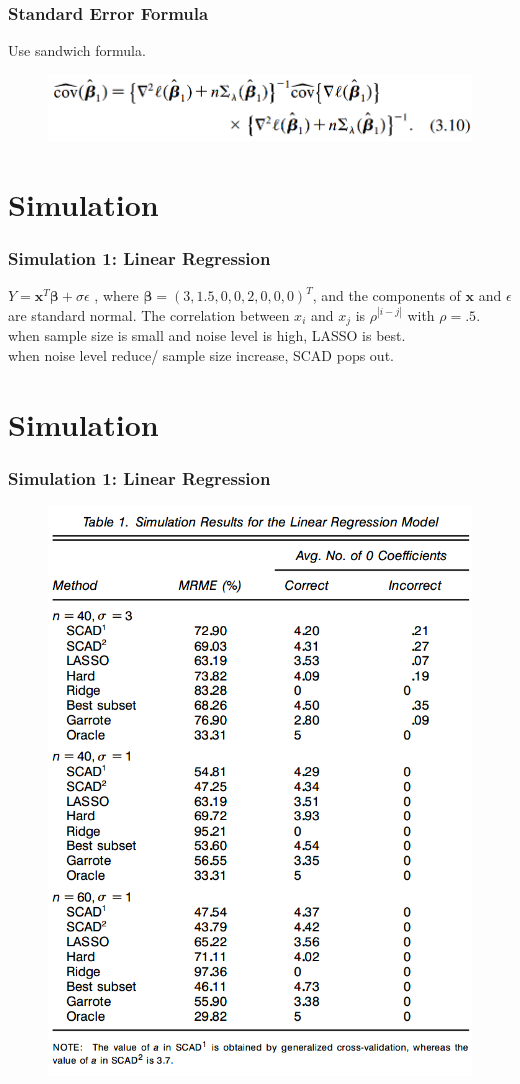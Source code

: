 \documentclass{beamer}
\begin{document}
	
	\begin{frame}
		\frametitle{Standard Error Formula}
		Use sandwich formula.
		\begin{figure}
			\includegraphics[width=0.7\linewidth]{image018.png}
		\end{figure}
	\end{frame}
	
	\section{Simulation}
	\begin{frame}
		\frametitle{Simulation 1: Linear Regression}
		$Y = \bm{x}^T\bm{\beta} + \sigma\epsilon$
		, where $\bm{\beta} = (3, 1.5, 0, 0, 2 ,0 ,0 ,0)^T$, and the components of $\bm{x}$ and $\epsilon$ are standard normal. The correlation between $x_i$ and $x_j$ is $\rho^{|i-j|}$ with $\rho = .5$.\\
		\vspace{\baselineskip}
		when sample size is small and noise level is high, LASSO is best.\\
		\vspace{\baselineskip}
		when noise level reduce/ sample size increase, SCAD pops out.
	\end{frame}
	
	\section{Simulation}
	\begin{frame}
		\frametitle{Simulation 1: Linear Regression}
		\begin{figure}
			\includegraphics[width=0.5\linewidth]{image019.png}
		\end{figure}
	\end{frame}
	
\end{document}
